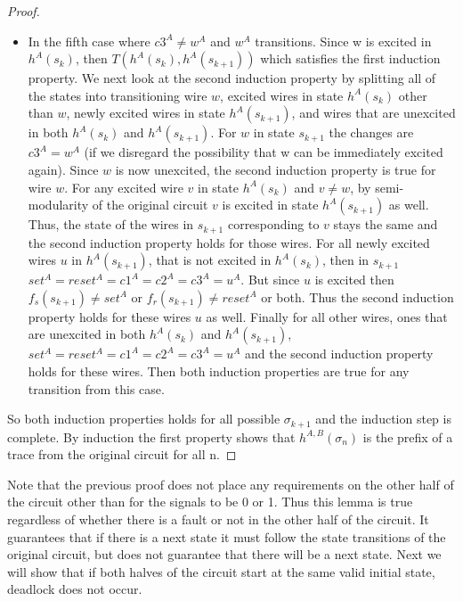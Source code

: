 \documentclass{article}
\begin{document}
\begin{proof}
\begin{itemize}
\item
In the fifth case where $c3^A\neq w^A$ and $w^A$ transitions.  Since w is excited in $h^A(s_k)$, then $T(h^A(s_k), h^A(s_{k+1}))$ which satisfies the first induction property.  We next look at the second induction property by splitting all of the states into transitioning wire $w$, excited wires in state $h^A(s_k)$ other than $w$, newly excited wires in state $h^A(s_{k+1})$, and wires that are unexcited in both $h^A(s_k)$ and $h^A(s_{k+1})$.  For $w$ in state $s_{k+1}$ the changes are $c3^{A}= w^{A}$ (if we disregard the possibility that w can be immediately excited again).  Since $w$ is now unexcited, the second induction property is true for wire $w$.  For any excited wire $v$ in state $h^A(s_k)$ and $v\neq w$, by semi-modularity of the original circuit $v$ is excited in state $h^A(s_{k+1})$ as well.  Thus, the state of the wires in $s_{k+1}$ corresponding to $v$ stays the same and the second induction property holds for those wires.  For all newly excited wires $u$ in $h^A(s_{k+1})$, that is not excited in $h^A(s_k)$, then in $s_{k+1}$  $set^A=reset^A=c1^A=c2^A=c3^A=u^A$.  But since $u$ is excited then $f_s(s_{k+1})\neq set^A$ or $f_r(s_{k+1})\neq reset^A$ or both.  Thus the second induction property holds for these wires $u$ as well.  Finally for all other wires, ones that are unexcited in both $h^A(s_k)$ and $h^A(s_{k+1})$, $set^A=reset^A=c1^A=c2^A=c3^A=u^A$ and the second induction property holds for these wires.  Then both induction properties are true for any transition from this case. 
\end{itemize}
So both induction properties holds for all possible $\sigma_{k+1}$ and the induction step is complete. \newline
By induction the first property shows that $h^{A,B}(\sigma_n)$ is the prefix of a trace from the original circuit for all n.


\end{proof}
Note that the previous proof does not place any requirements on the other half of the circuit other than for the signals to be 0 or 1.  Thus this lemma is true regardless of whether there is a fault or not in the other half of the circuit.  It guarantees that if there is a next state it must follow the state transitions of the original circuit, but does not guarantee that there will be a next state.  Next we will show that if both halves of the circuit start at the same valid initial state, deadlock does not occur.
\end{document}
